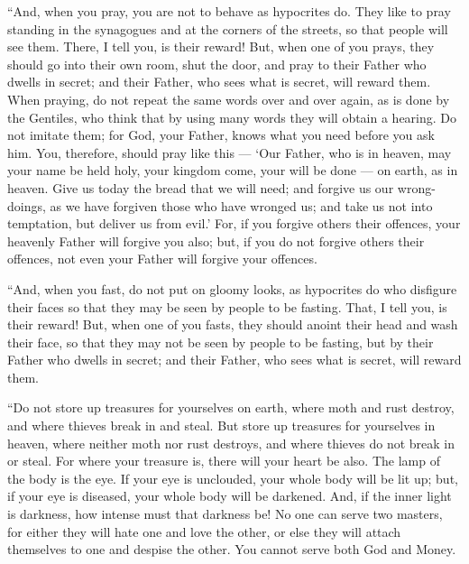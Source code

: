  ``And, when you pray, you are not to behave as hypocrites
do. They like to pray standing in the synagogues and at the corners of
the streets, so that people will see them. There, I tell you, is their
reward!  But, when one of you prays, they should go into
their own room, shut the door, and pray to their Father who dwells in
secret; and their Father, who sees what is secret, will reward them.
 When praying, do not repeat the same words over and over
again, as is done by the Gentiles, who think that by using many words
they will obtain a hearing.  Do not imitate them; for God,
your Father, knows what you need before you ask him.  You,
therefore, should pray like this --- `Our Father, who is in heaven, may
your name be held holy,  your kingdom come, your will be
done --- on earth, as in heaven.  Give us today the bread
that we will need;  and forgive us our wrong-doings, as we
have forgiven those who have wronged us;  and take us not
into temptation, but deliver us from evil.'  For, if you
forgive others their offences, your heavenly Father will forgive you
also;  but, if you do not forgive others their offences,
not even your Father will forgive your offences.

 ``And, when you fast, do not put on gloomy looks, as
hypocrites do who disfigure their faces so that they may be seen by
people to be fasting. That, I tell you, is their reward! 
But, when one of you fasts, they should anoint their head and wash their
face,  so that they may not be seen by people to be
fasting, but by their Father who dwells in secret; and their Father, who
sees what is secret, will reward them.

 ``Do not store up treasures for yourselves on earth, where
moth and rust destroy, and where thieves break in and steal.
 But store up treasures for yourselves in heaven, where
neither moth nor rust destroys, and where thieves do not break in or
steal.  For where your treasure is, there will your heart
be also.  The lamp of the body is the eye. If your eye is
unclouded, your whole body will be lit up;  but, if your
eye is diseased, your whole body will be darkened. And, if the inner
light is darkness, how intense must that darkness be!  No
one can serve two masters, for either they will hate one and love the
other, or else they will attach themselves to one and despise the other.
You cannot serve both God and Money.


